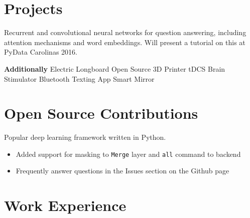 \documentclass[letterpaper]{deedy-resume} %
\begin{document}
\hfill
%
%
\begin{minipage}[t]{0.66\textwidth} %

\section{Projects}

\vspace{2mm}


Recurrent and convolutional neural networks for question answering, including attention mechanisms and word embeddings. Will present a tutorial on this at PyData Carolinas 2016.

\sectionspace

\textbf{Additionally} Electric Longboard \textbullet{} Open Source 3D Printer \textbullet{} tDCS Brain Stimulator \textbullet{} Bluetooth Texting App \textbullet{} Smart Mirror

\section{Open Source Contributions}


Popular deep learning framework written in Python.

\begin{itemize}
	\item{Added support for masking to \texttt{Merge} layer and \texttt{all} command to backend}
	\item{Frequently answer questions in the Issues section on the Github page}
\end{itemize}

\sectionspace


\section{Work Experience}



\end{minipage}
\end{document}
